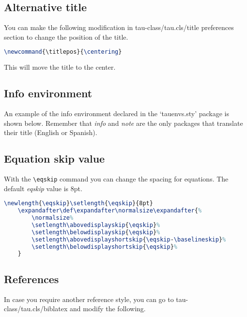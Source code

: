 \documentclass[9pt,a4paper,twoside]{tau-class/tau}
\begin{document}
    \subsection{Alternative title}

        You can make the following modification in tau-class/tau.cls/title preferences section to change the position of the title.

\nolinenumbers
\begin{lstlisting}[language=TeX, caption=Alternative title.]
\newcommand{\titlepos}{\centering}
\end{lstlisting}
\linenumbers

	This will move the title to the center. 

    \subsection{Info environment}

        An example of the info environment declared in the ‘tauenvs.sty’ package is shown below. Remember that \textit{info} and \textit{note} are the only packages that translate their title (English or Spanish).
		

    \subsection{Equation skip value}

        With the \verb|\eqskip| command you can change the spacing for equations. The default \textit{eqskip} value is 8pt.

\nolinenumbers
\begin{lstlisting}[language=TeX, caption=Equation skip code.]
\newlength{\eqskip}\setlength{\eqskip}{8pt}
	\expandafter\def\expandafter\normalsize\expandafter{%
		\normalsize%
		\setlength\abovedisplayskip{\eqskip}%
		\setlength\belowdisplayskip{\eqskip}%
		\setlength\abovedisplayshortskip{\eqskip-\baselineskip}%
		\setlength\belowdisplayshortskip{\eqskip}%
	}
\end{lstlisting}
\linenumbers
		
    \subsection{References}
		
        In case you require another reference style, you can go to tau-class/tau.cls/biblatex and modify the following.
		
\nolinenumbers

\end{document}
